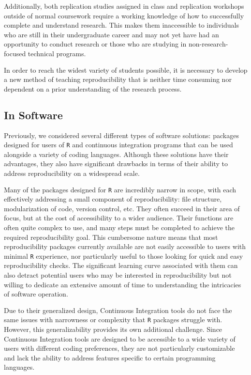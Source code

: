 \documentclass[12pt,twoside]{reedthesis}
\begin{document}
Additionally, both replication studies assigned in class and replication
workshops outside of normal coursework require a working knowledge of
how to successfully complete and understand research. This makes them
inaccessible to individuals who are still in their undergraduate career
and may not yet have had an opportunity to conduct research or those who
are studying in non-research-focused technical programs.

In order to reach the widest variety of students possible, it is
necessary to develop a new method of teaching reproducibility that is
neither time consuming nor dependent on a prior understanding of the
research process.

\subsection{In Software}\label{in-software}

Previously, we considered several different types of software solutions:
packages designed for users of \texttt{R} and continuous integration
programs that can be used alongside a variety of coding languages.
Although these solutions have their advantages, they also have
significant drawbacks in terms of their ability to address
reproducibility on a widespread scale.

Many of the packages designed for \texttt{R} are incredibly narrow in
scope, with each effectively addressing a small component of
reproducibility: file structure, modularization of code, version
control, etc. They often succeed in their area of focus, but at the cost
of accessibility to a wider audience. Their functions are often quite
complex to use, and many steps must be completed to achieve the required
reproducibility goal. This cumbersome nature means that most
reproducibility packages currently available are not easily accessible
to users with minimal \texttt{R} experience, nor particularly useful to
those looking for quick and easy reproducibility checks. The significant
learning curve associated with them can also detract potential users who
may be interested in reproducibility but not willing to dedicate an
extensive amount of time to understanding the intricacies of software
operation.

Due to their generalized design, Continuous Integration tools do not
face the same issues with narrowness or complexity that \texttt{R}
packages struggle with. However, this generalizability provides its own
additional challenge. Since Continuous Integration tools are designed to
be accessible to a wide variety of users with different coding
preferences, they are not particularly customizable and lack the ability
to address features specific to certain programming languages.
\end{document}

